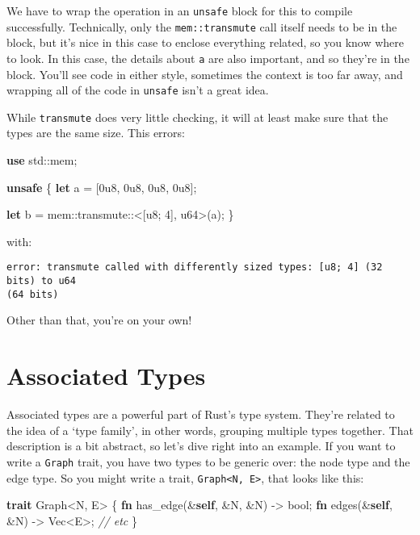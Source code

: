 \documentclass[a4paper,]{book}
\renewcommand*{\hypertarget}[3][\ar]{%
  \def\ar{#2}%
  \label{#1}%
  #3}
\newenvironment{Shaded}{\begin{snugshade}}{\end{snugshade}}
\newcommand{\KeywordTok}[1]{\textcolor[rgb]{0.13,0.29,0.53}{\textbf{{#1}}}}
\newcommand{\DataTypeTok}[1]{\textcolor[rgb]{0.13,0.29,0.53}{{#1}}}
\newcommand{\DecValTok}[1]{\textcolor[rgb]{0.00,0.00,0.81}{{#1}}}
\newcommand{\CommentTok}[1]{\textcolor[rgb]{0.56,0.35,0.01}{\textit{{#1}}}}
\newcommand{\NormalTok}[1]{{#1}}
\begin{document}
We have to wrap the operation in an \texttt{unsafe} block for this to
compile successfully. Technically, only the \texttt{mem::transmute} call
itself needs to be in the block, but it's nice in this case to enclose
everything related, so you know where to look. In this case, the details
about \texttt{a} are also important, and so they're in the block. You'll
see code in either style, sometimes the context is too far away, and
wrapping all of the code in \texttt{unsafe} isn't a great idea.

While \texttt{transmute} does very little checking, it will at least
make sure that the types are the same size. This errors:

\begin{Shaded}
\begin{Highlighting}[]
\KeywordTok{use} \NormalTok{std::mem;}

\KeywordTok{unsafe} \NormalTok{\{}
    \KeywordTok{let} \NormalTok{a = [}\DecValTok{0u8}\NormalTok{, }\DecValTok{0u8}\NormalTok{, }\DecValTok{0u8}\NormalTok{, }\DecValTok{0u8}\NormalTok{];}

    \KeywordTok{let} \NormalTok{b = mem::transmute::<[}\DataTypeTok{u8}\NormalTok{; }\DecValTok{4}\NormalTok{], }\DataTypeTok{u64}\NormalTok{>(a);}
\NormalTok{\}}
\end{Highlighting}
\end{Shaded}

with:

\begin{verbatim}
error: transmute called with differently sized types: [u8; 4] (32 bits) to u64
(64 bits)
\end{verbatim}

Other than that, you're on your own!

\hypertarget{sec--associated-types}{\section{Associated
Types}\label{sec--associated-types}}

Associated types are a powerful part of Rust's type system. They're
related to the idea of a `type family', in other words, grouping
multiple types together. That description is a bit abstract, so let's
dive right into an example. If you want to write a \texttt{Graph} trait,
you have two types to be generic over: the node type and the edge type.
So you might write a trait,
\texttt{Graph\textless{}N,\ E\textgreater{}}, that looks like this:

\begin{Shaded}
\begin{Highlighting}[]
\KeywordTok{trait} \NormalTok{Graph<N, E> \{}
    \KeywordTok{fn} \NormalTok{has_edge(&}\KeywordTok{self}\NormalTok{, &N, &N) -> }\DataTypeTok{bool}\NormalTok{;}
    \KeywordTok{fn} \NormalTok{edges(&}\KeywordTok{self}\NormalTok{, &N) -> }\DataTypeTok{Vec}\NormalTok{<E>;}
    \CommentTok{// etc}
\NormalTok{\}}
\end{Highlighting}
\end{Shaded}
\end{document}
